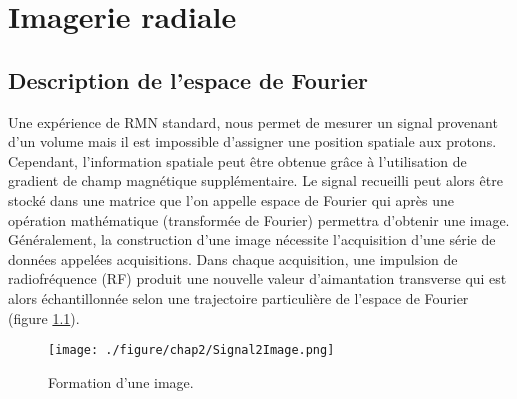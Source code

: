 \chapter{Imagerie radiale}
\setlength{\footskip}{50pt}
\label{Chap2}
\section{Description de l'espace de Fourier}

Une expérience de RMN standard, nous permet de mesurer un signal provenant d'un volume mais il est impossible d'assigner une position spatiale aux protons. Cependant, l'information spatiale peut être obtenue grâce à l'utilisation de gradient de champ magnétique supplémentaire. Le signal recueilli peut alors être stocké dans une matrice que l'on appelle espace de Fourier qui après une opération mathématique (transformée de Fourier) permettra d'obtenir une image. 
Généralement, la construction d'une image nécessite l'acquisition d'une série de données appelées acquisitions. Dans chaque acquisition, une impulsion de radiofréquence (RF) produit une nouvelle valeur d'aimantation transverse qui est alors échantillonnée selon une trajectoire particulière de l'espace de Fourier (figure \ref{fig:Signal2Image}).


\begin{figure}[h]
\centering
\texttt{[image: ./figure/chap2/Signal2Image.png]}
\caption[Formation d'une image]{\label{fig:Signal2Image} Formation d'une image. }
\end{figure}


